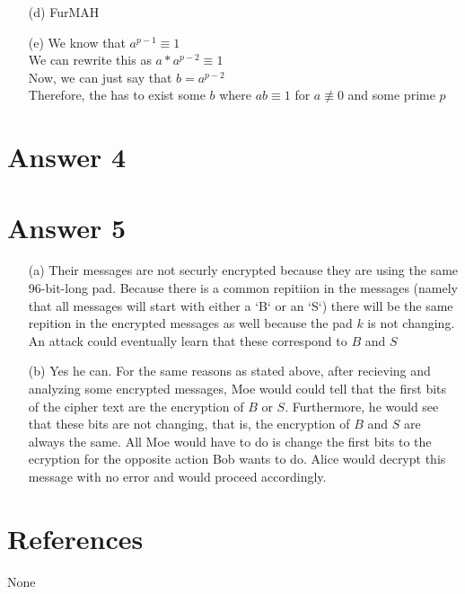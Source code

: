 \documentclass[11pt]{article}
\theoremstyle{definition}
\begin{document}
\begin{enumerate}
	\item[(d)] FurMAH

	\item[(e)]
	We know that $a^{p-1} \equiv 1$\\
	We can rewrite this as $a * a^{p-2} \equiv 1$\\
	Now, we can just say that $b = a^{p-2}$\\
	Therefore, the has to exist some $b$ where $ab \equiv 1$ for $a \not\equiv 0$ and some prime $p$

\end{enumerate}

\section*{Answer 4}


\section*{Answer 5}

	\begin{enumerate}
		\item[(a)] Their messages are not securly encrypted because they are using the same 96-bit-long pad.  Because there is a common repitiion in the messages (namely that all messages will start with either a `B` or an `S`) there will be the same repition in the encrypted messages as well because the pad $k$ is not changing.  An attack could eventually learn that these correspond to $B$ and $S$

		\item[(b)] Yes he can.  For the same reasons as stated above, after recieving and analyzing some encrypted messages, Moe would could tell that the first bits of the cipher text are the encryption of $B$ or $S$.  Furthermore, he would see that these bits are not changing, that is, the encryption of $B$ and $S$ are always the same.  All Moe would have to do is change the first bits to the ecryption for the opposite action Bob wants to do.  Alice would decrypt this message with no error and would proceed accordingly.
	\end{enumerate}


\noindent\hrulefill


\section*{References}

None
\end{document}
